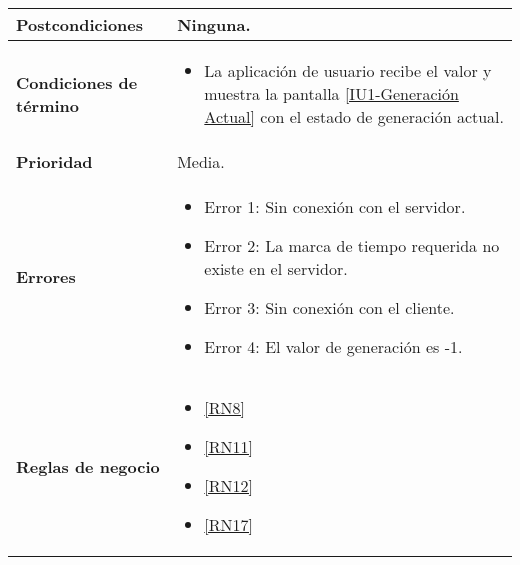 \begin{longtable}{|J{5cm}|J{10.3cm}|}
	\textbf{Postcondiciones} &
		Ninguna.\\ \hline
	\textbf{Condiciones de término} & 
		\begin{itemize}
			\item La aplicación de usuario recibe el valor y muestra la pantalla \hyperref[fig:monitoreo]{[IU1-Generación Actual]} con el estado de generación actual.
		\end{itemize} \\ \hline 
	\textbf{Prioridad} & 
		Media. \\ \hline
	\textbf{Errores} & 
		\begin{itemize}
		    \item \label{CUU1.1:Error1} Error 1: Sin conexión con el servidor.
			\item \label{CUU1.1:Error2} Error 2: La marca de tiempo requerida no existe en el servidor.
		    \item \label{CUU1.1:Error3} Error 3: Sin conexión con el cliente.
		    \item \label{CUU1.1:Error4} Error 4: El valor de generación es -1.
		\end{itemize} \\ \hline
	\textbf{Reglas de negocio} & 
		\begin{itemize}
		    \item \ref{RN8}
			\item \ref{RN11}
			\item \ref{RN12}
			\item \ref{RN17}
		\end{itemize} \\ \hline
\end{longtable}

